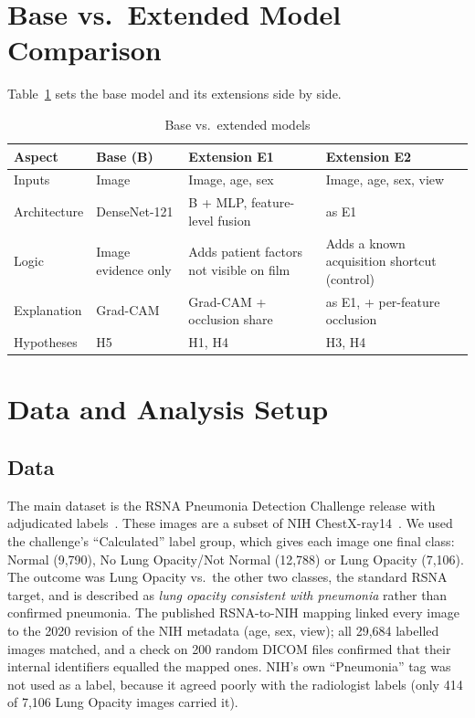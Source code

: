 \documentclass[conference]{IEEEtran}
\begin{document}
\section{Base vs.\ Extended Model Comparison}
\label{sec:compare}

Table~\ref{tab:basevsext} sets the base model and its extensions side by side.

\begin{table}[!t]
\caption{Base vs.\ extended models}
\label{tab:basevsext}
\centering
\footnotesize
\begin{tabular}{@{}p{1.55cm}p{1.95cm}p{2.0cm}p{2.0cm}@{}}
\toprule
Aspect & Base (B) & Extension E1 & Extension E2 \\
\midrule
Inputs & Image & Image, age, sex & Image, age, sex, view \\
Architecture & DenseNet-121 & B + MLP, feature-level fusion & as E1 \\
Logic & Image evidence only & Adds patient factors not visible on film & Adds a known acquisition shortcut (control) \\
Explanation & Grad-CAM & Grad-CAM + occlusion share~\cite{gapp2025modality} & as E1, + per-feature occlusion \\
Hypotheses & H5 & H1, H4 & H3, H4 \\
\bottomrule
\end{tabular}
\end{table}

\section{Data and Analysis Setup}
\label{sec:setup}

\subsection{Data}
The main dataset is the RSNA Pneumonia Detection Challenge release with adjudicated labels~\cite{shih2019rsna}. These images are a subset of NIH ChestX-ray14~\cite{wang2017chestxray8}. We used the challenge's ``Calculated'' label group, which gives each image one final class: Normal (9,790), No Lung Opacity/Not Normal (12,788) or Lung Opacity (7,106). The outcome was Lung Opacity vs.\ the other two classes, the standard RSNA target, and is described as \emph{lung opacity consistent with pneumonia} rather than confirmed pneumonia. The published RSNA-to-NIH mapping linked every image to the 2020 revision of the NIH metadata (age, sex, view); all 29,684 labelled images matched, and a check on 200 random DICOM files confirmed that their internal identifiers equalled the mapped ones. NIH's own ``Pneumonia'' tag was not used as a label, because it agreed poorly with the radiologist labels (only 414 of 7,106 Lung Opacity images carried it).
\end{document}
